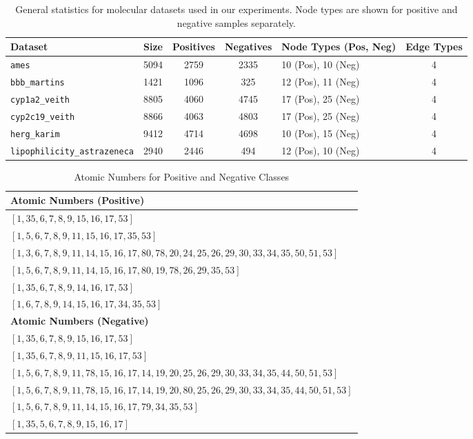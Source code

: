 \begin{table}[htbp]
    \centering
    \small
    \caption{General statistics for molecular datasets used in our experiments. Node types are shown for positive and negative samples separately.}
    \begin{tabular}{|l|c|c|c|p{3.3cm}|c|}
        \hline
        \textbf{Dataset} & \textbf{Size} & \textbf{Positives} & \textbf{Negatives} & \textbf{Node Types (Pos, Neg)} & \textbf{Edge Types} \\
        \hline
        \texttt{ames} & 5094 & 2759 & 2335 & 10 (Pos), 10 (Neg) & 4 \\
        \texttt{bbb\_martins} & 1421 & 1096 & 325 & 12 (Pos), 11 (Neg) & 4 \\
        \texttt{cyp1a2\_veith} & 8805 & 4060 & 4745 & 17 (Pos), 25 (Neg) & 4 \\
        \texttt{cyp2c19\_veith} & 8866 & 4063 & 4803 & 17 (Pos), 25 (Neg) & 4 \\
        \texttt{herg\_karim} & 9412 & 4714 & 4698 & 10 (Pos), 15 (Neg) & 4 \\
        \texttt{lipophilicity\_astrazeneca} & 2940 & 2446 & 494 & 12 (Pos), 10 (Neg) & 4 \\
        \hline
    \end{tabular}
\end{table}

\bigskip

\begin{table}[htbp]
    \centering
    \caption{Atomic Numbers for Positive and Negative Classes}
    \begin{tabular}{|l|}
        \hline
        \textbf{Atomic Numbers (Positive)} \\
        \hline
        $[1, 35, 6, 7, 8, 9, 15, 16, 17, 53]$ \\
        $[1, 5, 6, 7, 8, 9, 11, 15, 16, 17, 35, 53]$ \\
        $[1, 3, 6, 7, 8, 9, 11, 14, 15, 16, 17, 80, 78, 20, 24, 25, 26, 29, 30, 33, 34, 35, 50, 51, 53]$ \\
        $[1, 5, 6, 7, 8, 9, 11, 14, 15, 16, 17, 80, 19, 78, 26, 29, 35, 53]$ \\
        $[1, 35, 6, 7, 8, 9, 14, 16, 17, 53]$ \\
        $[1, 6, 7, 8, 9, 14, 15, 16, 17, 34, 35, 53]$ \\
        \hline
        \textbf{Atomic Numbers (Negative)} \\
        \hline
        $[1, 35, 6, 7, 8, 9, 15, 16, 17, 53]$ \\
        $[1, 35, 6, 7, 8, 9, 11, 15, 16, 17, 53]$ \\
        $[1, 5, 6, 7, 8, 9, 11, 78, 15, 16, 17, 14, 19, 20, 25, 26, 29, 30, 33, 34, 35, 44, 50, 51, 53]$ \\
        $[1, 5, 6, 7, 8, 9, 11, 78, 15, 16, 17, 14, 19, 20, 80, 25, 26, 29, 30, 33, 34, 35, 44, 50, 51, 53]$ \\
        $[1, 5, 6, 7, 8, 9, 11, 14, 15, 16, 17, 79, 34, 35, 53]$ \\
        $[1, 35, 5, 6, 7, 8, 9, 15, 16, 17]$ \\
        \hline
    \end{tabular}
\end{table}

